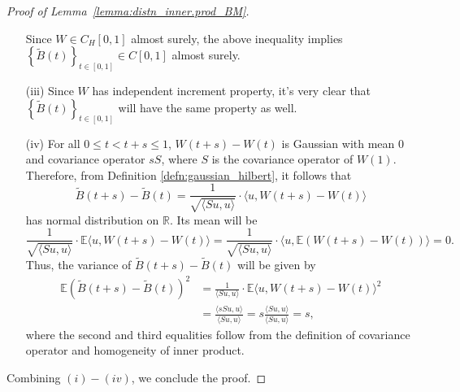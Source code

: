 \documentclass[11pt]{article}
\newcommand{\bE}{\mathbb{E}}
\theoremstyle{plain}
\theoremstyle{definition}
\theoremstyle{remark}
\begin{document}
\begin{appendix}
\begin{proof}[Proof of Lemma~\ref{lemma:distn_inner.prod_BM}]
\begin{itemize}
         Since $W\in C_H[0,1]$ almost surely, the above inequality implies $\left\{\tilde{B}(t)\right\}_{t \in [0,1]}\in C[0,1]$ almost surely.
         \item [(iii)] Since $W$ has independent increment property, it's very clear that $\left\{\tilde{B}(t)\right\}_{t \in [0,1]}$ will have the same property as well.
         \item [(iv)] For all $0\leq t<t+s\leq 1$, $W(t+s)-W(t)$ is Gaussian with mean $0$ and covariance operator $sS$, where $S$ is the covariance operator of $W(1)$. Therefore, from Definition \ref{defn:gaussian_hilbert}, it follows that 
         $$\tilde{B}(t+s)-\tilde{B}(t)=\frac{1}{\sqrt{\langle Su, u \rangle}}\cdot \langle u, W(t+s)-W(t)\rangle$$
         has normal distribution on $\mathbb{R}$. Its mean will be
         $$\frac{1}{\sqrt{\langle Su, u \rangle}}\cdot \bE\langle u, W(t+s)-W(t)\rangle=\frac{1}{\sqrt{\langle Su, u \rangle}}\cdot \langle u, \bE(W(t+s)-W(t))\rangle=0.$$
         Thus, the variance of $\tilde{B}(t+s)-\tilde{B}(t)$ will be given by
         \begin{align*}
             \bE(\tilde{B}(t+s)-\tilde{B}(t))^2&=\frac{1}{\langle Su, u \rangle}\cdot \bE\langle u, W(t+s)-W(t)\rangle^2\\
             &=\frac{\langle sSu, u \rangle}{\langle Su, u \rangle}=s \frac{\langle Su, u \rangle}{\langle Su, u \rangle}=s,
         \end{align*}
         where the second and third equalities follow from the definition of covariance operator and homogeneity of inner product.
     \end{itemize}
     Combining $(i)-(iv)$, we conclude the proof.
 \end{proof}



\end{appendix}
\end{document}
